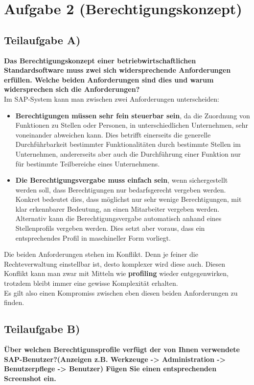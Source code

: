 \section{Aufgabe 2 (Berechtigungskonzept)}
\label{sec:Aufgabe 2 (Berechtigungskonzept)}

\subsection{Teilaufgabe A)}
\textbf{Das Berechtigungskonzept einer betriebwirtschaftlichen
Standardsoftware muss zwei sich widersprechende Anforderungen erfüllen. 
Welche beiden Anforderungen sind dies und warum widersprechen sich die
Anforderungen?}\\

Im SAP-System kann man zwischen zwei Anforderungen unterscheiden:

\begin{itemize}
  \item \textbf{Berechtigungen müssen sehr fein steuerbar sein}, da die
  Zuordnung von Funktionen zu Stellen oder Personen, in unterschiedlichen
  Unternehmen, sehr voneinander abweichen kann. Dies betrifft einerseits die
  generelle Durchführbarkeit bestimmter Funktionalitäten durch bestimmte Stellen im
  Unternehmen, andererseits aber auch die Durchführung einer Funktion nur für
  bestimmte Teilbereiche eines Unternehmens.
  
  \item \textbf{Die Berechtigungsvergabe muss einfach sein}, wenn sichergestellt
  werden soll, dass Berechtigungen nur bedarfsgerecht vergeben werden. Konkret
  bedeutet dies, dass möglichst nur sehr wenige Berechtigungen, mit klar
  erkennbarer Bedeutung, an einen Mitarbeiter vergeben werden. Alternativ kann
  die Berechtigungsvergabe automatisch anhand eines Stellenprofils vergeben
  werden. Dies setzt aber voraus, dass ein entsprechendes Profil in maschineller
  Form vorliegt.
\end{itemize}

Die beiden Anforderungen stehen im Konflikt. 
Denn je feiner die Rechteverwaltung einstellbar ist,
desto komplexer wird diese auch. Diesen Konflikt kann man zwar mit Mitteln wie
\textbf{profiling} wieder entgegenwirken, trotzdem bleibt immer eine gewisse
Komplexität erhalten.\\

Es gilt also einen Kompromiss zwischen eben diesen beiden Anforderungen zu
finden.
\clearpage

\subsection{Teilaufgabe B)}
\textbf{Über welchen Berechtigunsprofile verfügt der von Ihnen verwendete
SAP-Benutzer?(Anzeigen z.B. Werkzeuge -> Administration -> Benutzerpflege ->
Benutzer) Fügen Sie einen entsprechenden Screenshot ein.}\\[2ex]

